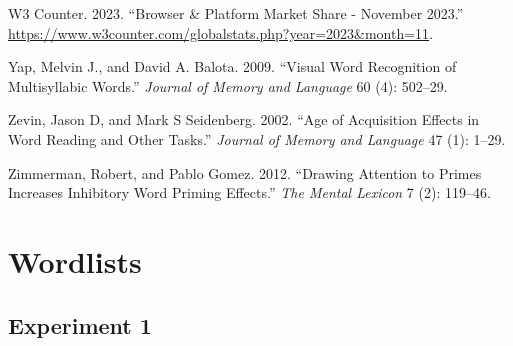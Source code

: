 \documentclass[
]{interact}
\newlength{\cslhangindent}
\newenvironment{CSLReferences}[2] %
 {\begin{list}{}{%
  \setlength{\itemindent}{0pt}
  \setlength{\leftmargin}{0pt}
  \setlength{\parsep}{0pt}
  \ifodd #1
   \setlength{\leftmargin}{\cslhangindent}
   \setlength{\itemindent}{-1\cslhangindent}
  \fi
  \setlength{\itemsep}{#2\baselineskip}}}
 {\end{list}}
\begin{document}
\begin{CSLReferences}{1}{0}
W3 Counter. 2023. {``Browser \& Platform Market Share - November
2023.''}
\url{https://www.w3counter.com/globalstats.php?year=2023&month=11}.

Yap, Melvin J., and David A. Balota. 2009. {``Visual Word Recognition of
Multisyllabic Words.''} \emph{Journal of Memory and Language} 60 (4):
502--29.

Zevin, Jason D, and Mark S Seidenberg. 2002. {``Age of Acquisition
Effects in Word Reading and Other Tasks.''} \emph{Journal of Memory and
Language} 47 (1): 1--29.

Zimmerman, Robert, and Pablo Gomez. 2012. {``Drawing Attention to Primes
Increases Inhibitory Word Priming Effects.''} \emph{The Mental Lexicon}
7 (2): 119--46.

\end{CSLReferences}

\newpage{}

\section*{Wordlists}\label{wordlists}

\subsection*{Experiment 1}\label{experiment-1}
\end{document}
